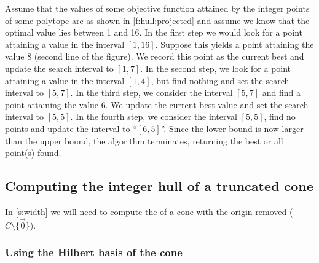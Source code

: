\begin{example}
\label{ex:hull:projected}
Assume that the values of some objective function attained
by the integer points of some polytope are as shown in
\autoref{f:hull:projected} and assume we know that the optimal
value lies between 1 and 16.
In the first step we would look for a point attaining a value
in the interval $[1,16]$.  Suppose this yields a point attaining
the value $8$ (second line of the figure).  We record this point
as the current best and update the search interval to $[1,7]$.
In the second step, we look for a point attaining a value
in the interval $[1,4]$, but find nothing and set the search interval
to $[5,7]$.
In the third step, we consider the interval $[5,7]$ and find
a point attaining the value 6.  We update the current best value
and set the search interval to $[5,5]$.
In the fourth step, we consider the interval $[5,5]$, find no
points and update the interval to ``$[6,5]$''.
Since the lower bound is now larger than the upper bound, the
algorithm terminates, returning the best or all point(s) found.
\end{example}


\subsection{Computing the integer hull of a truncated cone}
\label{s:hull:cone}

In \autoref{s:width} we will need to compute the 
of a cone with the origin removed ($C \setminus \{ \vec 0 \}$).

\subsubsection{Using the Hilbert basis of the cone}

